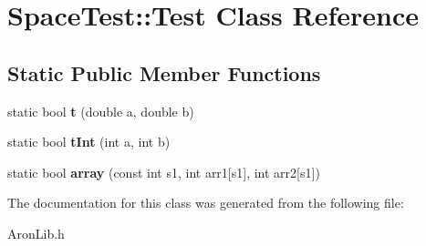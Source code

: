 \hypertarget{class_space_test_1_1_test}{}\section{Space\+Test\+:\+:Test Class Reference}
\label{class_space_test_1_1_test}
\subsection*{Static Public Member Functions}
\begin{DoxyCompactItemize}
\item 
\mbox{\label{class_space_test_1_1_test_a5887b0a589deafcecd50c7c0018897d7}} 
static bool {\bfseries t} (double a, double b)
\item 
\mbox{\label{class_space_test_1_1_test_af846f71be01ca530273d23e3f6b3e9a2}} 
static bool {\bfseries t\+Int} (int a, int b)
\item 
\mbox{\label{class_space_test_1_1_test_acc1fb89ad587be5ff960a2db96443d23}} 
static bool {\bfseries array} (const int s1, int arr1\mbox{[}s1\mbox{]}, int arr2\mbox{[}s1\mbox{]})
\end{DoxyCompactItemize}


The documentation for this class was generated from the following file\+:\begin{DoxyCompactItemize}
\item 
Aron\+Lib.\+h\end{DoxyCompactItemize}
